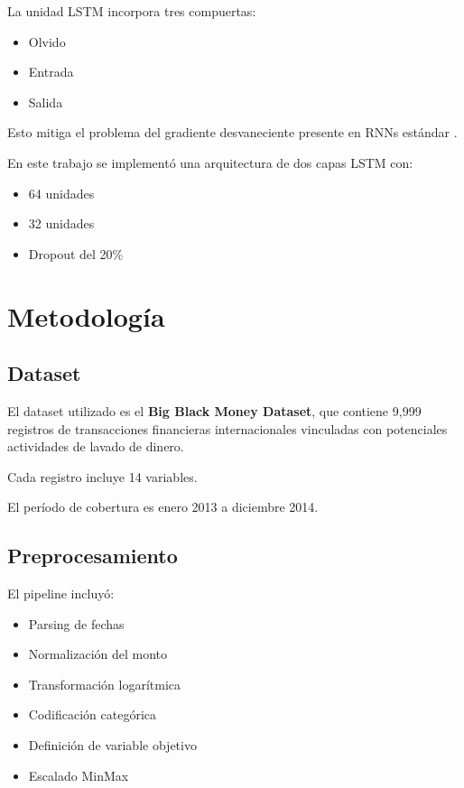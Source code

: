 \documentclass[12pt]{article}
\begin{document}
La unidad LSTM incorpora tres compuertas:

\begin{itemize}
\item Olvido
\item Entrada
\item Salida
\end{itemize}

Esto mitiga el problema del gradiente desvaneciente presente en RNNs estándar \cite{hochreiter1997lstm}.

En este trabajo se implementó una arquitectura de dos capas LSTM con:

\begin{itemize}
\item 64 unidades
\item 32 unidades
\item Dropout del 20\%
\end{itemize}

\section{Metodología}

\subsection{Dataset}

El dataset utilizado es el \textbf{Big Black Money Dataset}, que contiene 9,999 registros de transacciones financieras internacionales vinculadas con potenciales actividades de lavado de dinero.

Cada registro incluye 14 variables.

El período de cobertura es enero 2013 a diciembre 2014.

\subsection{Preprocesamiento}

El pipeline incluyó:

\begin{itemize}
\item Parsing de fechas
\item Normalización del monto
\item Transformación logarítmica
\item Codificación categórica
\item Definición de variable objetivo
\item Escalado MinMax
\end{itemize}
\end{document}
